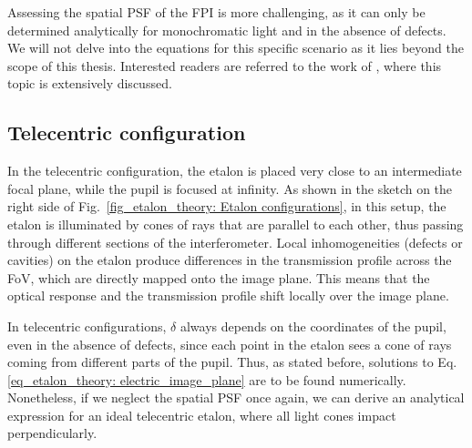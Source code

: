Assessing the spatial PSF of the FPI is more challenging, as it can only be determined analytically for monochromatic light and in the absence of defects. We will not delve into the equations for this specific scenario as it lies beyond the scope of this thesis. Interested readers are referred to the work of \cite{fran_review}, where this topic is extensively discussed.

\subsection{\label{susec_etalon_theory: Tele-perfe}Telecentric configuration}

In the telecentric configuration, the etalon is placed very close to an intermediate focal plane, while the pupil is focused at infinity. As shown in the sketch on the right side of Fig.~{\ref{fig_etalon_theory: Etalon configurations}}, in this setup, the etalon is illuminated by cones of rays that are parallel to each other, thus passing through different sections of the interferometer. Local inhomogeneities (defects or cavities) on the etalon produce differences in the transmission profile across the FoV, which are directly mapped onto the image plane. This means that the optical response and the transmission profile shift locally over the image plane. 

In telecentric configurations, $\delta$ always depends on the coordinates of the pupil, even in the absence of defects, since each point in the etalon sees a cone of rays coming from different parts of the pupil. Thus, as stated before, solutions to Eq. \eqref{eq_etalon_theory: electric_image_plane} are to be found numerically. Nonetheless, if we neglect the spatial PSF once again, we can derive an analytical expression for an ideal telecentric etalon, where all light cones impact perpendicularly.

